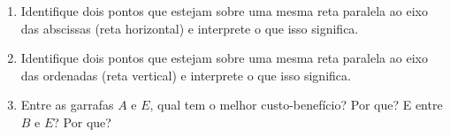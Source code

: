 \begin{enumerate}
\begin{enumerate}
\item {} 
Identifique dois pontos que estejam sobre uma mesma reta paralela ao eixo das abscissas (reta horizontal) e interprete o que isso significa.

\item {} 
Identifique dois pontos que estejam sobre uma mesma reta paralela ao eixo das ordenadas (reta vertical) e interprete o que isso significa.

\item {} 
Entre as garrafas \(A\) e \(E\), qual tem o melhor custo-benefício? Por que? E entre \(B\) e \(E\)? Por que?

\end{enumerate}
\end{enumerate}


\ifnum{}
\clearpage
\else
\notasfinais
\fi




\nocite{*}